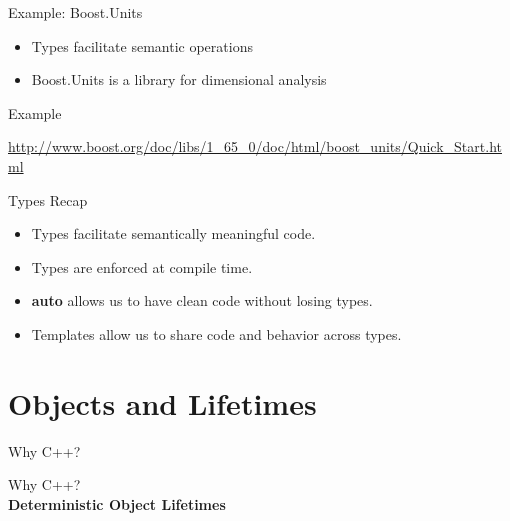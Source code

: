 \documentclass{beamer}
\begin{document}
	\begin{frame}{Example: Boost.Units}
		\begin{itemize}
			\item Types facilitate semantic operations
			\item Boost.Units is a library for dimensional analysis
		\end{itemize}
		
		\begin{exampleblock}{Example}
		\lstI
		\end{exampleblock}
		
		\bigskip
		\bigskip
		
		\begin{center}
			\tiny{\url{http://www.boost.org/doc/libs/1_65_0/doc/html/boost_units/Quick_Start.html}}
		\end{center}
	\end{frame}
	
	\begin{frame}{Types Recap}
		\begin{itemize}
			\item Types facilitate semantically meaningful code.
			\medskip
			\item Types are enforced at compile time.
			\medskip
			\item \textbf{auto} allows us to have clean code without losing types.
			\medskip
			\item Templates allow us to share code and behavior across types.
		\end{itemize}
	\end{frame}
	
	\section{Objects and Lifetimes}
	
	\begin{frame}
		\begin{center}
			Why C++?
		\end{center}
	\end{frame}
	
	\begin{frame}
		\begin{center}
			Why C++?\\
			\bigskip
			\textbf{Deterministic Object Lifetimes}
		\end{center}
	\end{frame}
	
\end{document}
